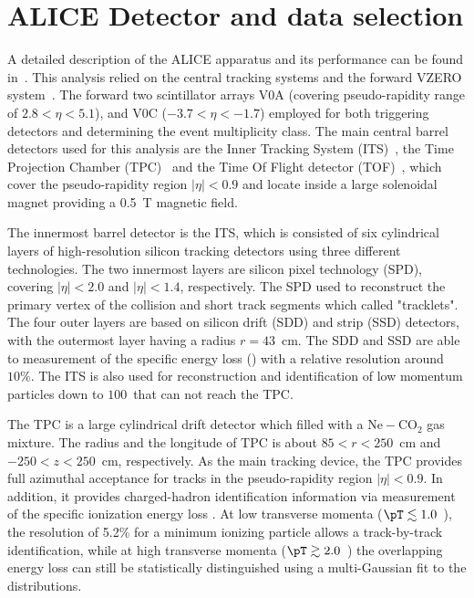 
\section{ALICE Detector and data selection}%
\label{sec:Detector}

A detailed description of the ALICE apparatus and its performance can be found in~\cite{Collaboration_2008, Abelev:2014ffa}.
This analysis relied on the central tracking systems and the forward VZERO system~\cite{collaboration_2013}.
The forward two scintillator arrays V0A (covering pseudo-rapidity range of $2.8 < \eta < 5.1$), and V0C ($-3.7 < \eta < -1.7$) employed for both triggering detectors and determining the event multiplicity class.
The main central barrel detectors used for this analysis are the Inner Tracking System (ITS)~\cite{collaboration_2010}, the Time Projection Chamber (TPC)~\cite{ALME2010316} and the Time Of Flight detector (TOF)~\cite{PIDwithTOF, TOF, TOFResults, Carnesecchi:2018oss}, which cover the pseudo-rapidity region $|\eta| < 0.9$ and locate inside a large solenoidal magnet providing a 0.5~T magnetic field.

The innermost barrel detector is the ITS, which is consisted of six cylindrical layers of high-resolution silicon tracking detectors using three different technologies.
The two innermost layers are silicon pixel technology (SPD), covering $|\eta| < 2.0$ and $|\eta| < 1.4$, respectively.
The SPD used to reconstruct the primary vertex of the collision and short track segments which called "tracklets".
The four outer layers are based on silicon drift (SDD) and strip (SSD) detectors, with the outermost layer having a radius $r = 43$~cm.
The SDD and SSD are able to measurement of the specific energy loss (\dEdx) with a relative resolution around $10\%$.
The ITS is also used for reconstruction and identification of low momentum particles down to $100$~\MeVc that can not reach the TPC.

The TPC is a large cylindrical drift detector which filled with a $\mathrm{Ne-CO_{2}}$ gas mixture.
The radius and the longitude of TPC is about $85 < r < 250 $~cm and $-250 < z < 250 $~cm, respectively.
As the main tracking device, the TPC provides full azimuthal acceptance for tracks in the pseudo-rapidity region $|\eta| < 0.9$.
In addition, it provides charged-hadron identification information via measurement of the specific ionization energy loss \dEdx.
At low transverse momenta ($\pT \lesssim 1.0$~\GeVc), the \dEdx resolution of 5.2\% for a minimum ionizing particle allows a track-by-track identification, while at high transverse momenta ($\pT \gtrsim 2.0$~\GeVc) the overlapping energy loss can still be statistically distinguished using a multi-Gaussian fit to the \dEdx distributions.

